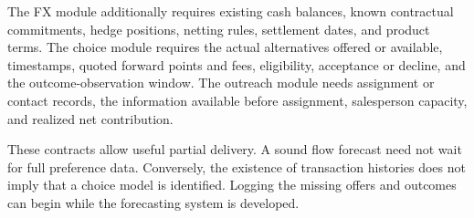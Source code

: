The FX module additionally requires existing cash balances, known contractual commitments, hedge positions, netting rules, settlement dates, and product terms. The choice module requires the actual alternatives offered or available, timestamps, quoted forward points and fees, eligibility, acceptance or decline, and the outcome-observation window. The outreach module needs assignment or contact records, the information available before assignment, salesperson capacity, and realized net contribution.

These contracts allow useful partial delivery. A sound flow forecast need not wait for full preference data. Conversely, the existence of transaction histories does not imply that a choice model is identified. Logging the missing offers and outcomes can begin while the forecasting system is developed.

